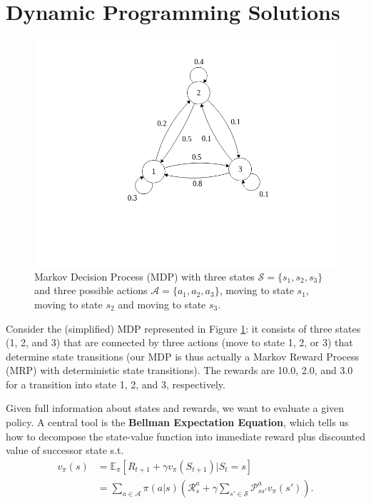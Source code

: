     
\section{Dynamic Programming Solutions}

\begin{figure}[!ht]
\centering
\includegraphics[scale=0.5,trim={0 5cm 0 1cm},clip]{figs/reinforcement_learning/mdp.png}
\caption{Markov Decision Process (MDP) with three states $\mathcal{S}=\{s_1,s_2,s_3\}$ and three possible actions $\mathcal{A}=\{a_1,a_2,a_3\}$, moving to state $s_1$, moving to state $s_2$ and moving to state $s_3$.}
\label{fig:MDP}
\end{figure}

Consider the (simplified) MDP represented in Figure \ref{fig:MDP}: it consists of three states (1, 2, and 3) that are connected by three actions (move to state 1, 2, or 3) that determine state transitions (our MDP is thus actually a Markov Reward Process (MRP) with deterministic state transitions). The rewards are 10.0, 2.0, and 3.0 for a transition into state 1, 2, and 3, respectively. 

Given full information about states and rewards, we want to evaluate a given policy. A central tool is the \textbf{Bellman Expectation Equation}, which tells us how to decompose the state-value function into immediate reward plus discounted value of successor state s.t.
\begin{align*}
    v_{\pi}(s) & = \mathbb{E}_{\pi}[R_{t+1} + \gamma v_{\pi}(S_{t+1}) | S_t = s]\\
    & = \sum_{a \in \mathcal{A}} \pi(a|s) \left( \mathcal{R}_s^a + \gamma \sum_{s' \in \mathcal{S}} \mathcal{P}_{ss'}^a v_{\pi}(s') \right).
\end{align*}

